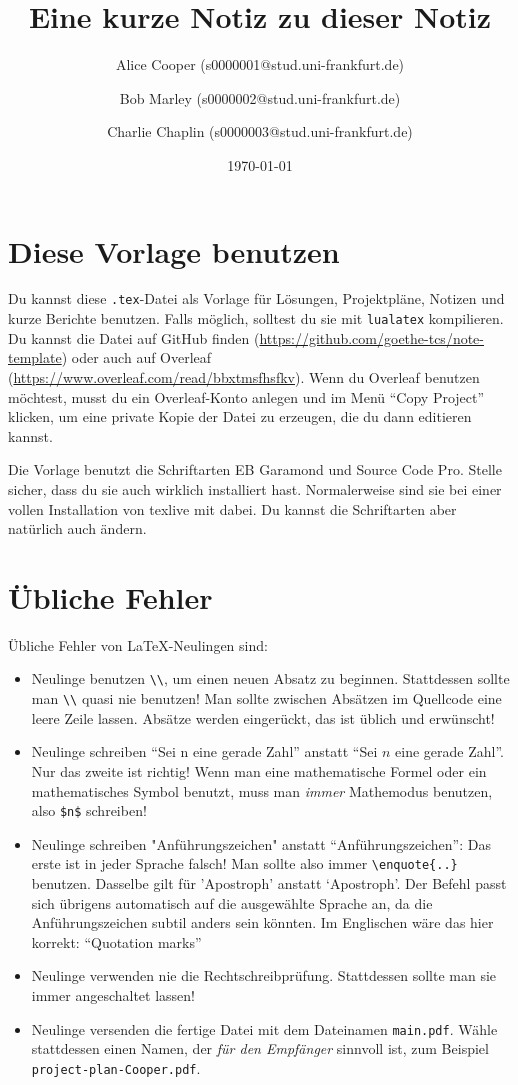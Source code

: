\documentclass[a4paper,11pt,oneside]{scrartcl}
\title{Eine kurze Notiz zu dieser Notiz}
\author{%
  Alice Cooper (s0000001@stud.uni-frankfurt.de)%
  \and Bob Marley (s0000002@stud.uni-frankfurt.de)%
  \and Charlie Chaplin (s0000003@stud.uni-frankfurt.de)%
}
\date{\today}
\begin{document}
\maketitle

\section*{Diese Vorlage benutzen}

Du kannst diese \texttt{.tex}-Datei als Vorlage für Lösungen, Projektpläne, Notizen und kurze Berichte benutzen.
Falls möglich, solltest du sie mit \verb|lualatex| kompilieren.
Du kannst die Datei auf GitHub finden (\url{https://github.com/goethe-tcs/note-template}) oder auch auf Overleaf (\url{https://www.overleaf.com/read/bbxtmsfhsfkv}). Wenn du Overleaf benutzen möchtest, musst du ein Overleaf-Konto anlegen und im Menü \hyphenquote{english}{Copy Project} klicken, um eine private Kopie der Datei zu erzeugen, die du dann editieren kannst.

Die Vorlage benutzt die Schriftarten EB Garamond und Source Code Pro. Stelle sicher, dass du sie auch wirklich installiert hast. Normalerweise sind sie bei einer vollen Installation von texlive mit dabei. Du kannst die Schriftarten aber natürlich auch ändern.

\section*{Übliche Fehler}

Übliche Fehler von \LaTeX{}-Neulingen sind:
\begin{itemize}
  \item Neulinge benutzen \verb|\\|, um einen neuen Absatz zu beginnen. Stattdessen sollte man \verb|\\| quasi nie benutzen!
  Man sollte zwischen Absätzen im Quellcode eine leere Zeile lassen. Absätze werden eingerückt, das ist üblich und erwünscht!
  \item Neulinge schreiben \enquote{Sei n eine gerade Zahl} anstatt \enquote{Sei $n$ eine gerade Zahl}. Nur das zweite ist richtig! Wenn man eine mathematische Formel oder ein mathematisches Symbol benutzt, muss man \emph{immer} Mathemodus benutzen, also \verb|$n$| schreiben!
  \item Neulinge schreiben "Anführungszeichen" anstatt \enquote{Anführungszeichen}: Das erste ist in jeder Sprache falsch! Man sollte also immer \verb|\enquote{..}| benutzen.
  Dasselbe gilt für 'Apostroph' anstatt \enquote*{Apostroph}.
  Der Befehl passt sich übrigens automatisch auf die ausgewählte Sprache an, da die Anführungszeichen subtil anders sein könnten.
  Im Englischen wäre das hier korrekt:
  \foreignlanguage{english}{\enquote{Quotation marks}}
  \item Neulinge verwenden nie die Rechtschreibprüfung. Stattdessen sollte man sie immer angeschaltet lassen!
  \item Neulinge versenden die fertige Datei mit dem Dateinamen \verb|main.pdf|. Wähle stattdessen einen Namen, der \emph{für den Empfänger} sinnvoll ist, zum Beispiel \verb|project-plan-Cooper.pdf|.
\end{itemize}
\end{document}
